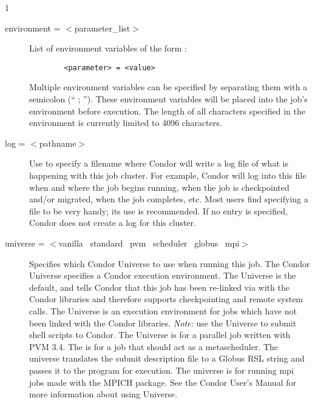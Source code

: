 \begin{ManPage}{\label{man-condor-submit}}{1}
\begin{description}

\item[environment = $<$parameter\_list$>$] List of environment variables
of the form :
\begin{verbatim}
        <parameter> = <value>
\end{verbatim}
Multiple environment variables can be specified by separating them with a
semicolon (`` ; ''). These environment variables will be placed into the
job's environment before execution. The length of all characters
specified in the environment is currently limited to 4096 characters. 


\item[log = $<$pathname$>$] Use  to specify a filename where
Condor will write a log file of what is happening with this job cluster.
For example, Condor will log into this file when and where the job
begins running, when the job is checkpointed and/or migrated, when the
job completes, etc. Most users find specifying a  file to be very
handy; its use is recommended. If no  entry is specified, 
Condor does not create a log for this cluster.


\item[universe = $<$vanilla \Bar\ standard \Bar\ pvm \Bar\ scheduler
\Bar\ globus \Bar\ mpi$>$] 
Specifies which Condor Universe to use when running this job.  The Condor 
Universe specifies a Condor execution environment.  The  
Universe is the default, and tells Condor that this job has been re-linked 
via  with the Condor libraries and therefore supports
checkpointing and remote system calls.  The  Universe is an
execution environment for jobs which have not been linked with the
Condor libraries.  \textit{Note:} use the  Universe to
submit shell scripts to Condor.  The  Universe is for a
parallel job written with PVM 3.4. The  is for a job that
should act as a metascheduler. The  universe translates the
submit description file to a Globus RSL string and passes it to 
the  program for execution.  The  universe is
for running mpi jobs made with the MPICH package.
See the Condor User's Manual for more information about using Universe.



\end{description}
\end{ManPage}
